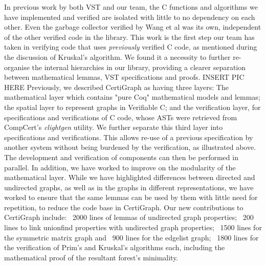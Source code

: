 In previous work by both VST and our team, the C functions and algorithms we have implemented and verified are isolated with little to no dependency on each other. Even the garbage collector verified by Wang et al was its own, independent of the other verified code in the library. This work is the first step our team has taken in verifying code that uses \textit{previously} verified C code, as mentioned during the discussion of Kruskal's algorithm. We found it a necessity to further re-organise the internal hierarchies in our library, providing a clearer separation between mathematical lemmas, VST specifications and proofs.
\newline\newline
INSERT PIC HERE
\newline\newline
Previously, we described CertiGraph as having three layers: The mathematical layer which contains "pure Coq" mathematical models and lemmas; the spatial layer to represent graphs in Verifiable C; and the verification layer, for specifications and verifications of C code, whose ASTs were retrieved from CompCert's \textit{clightgen} utility. We further separate this third layer into specifications and verifications. This allows re-use of a previous specification by another system without being burdened by the verification, as illustrated above. The development and verification of components can then be performed in parallel.
\newline\newline
In addition, we have worked to improve on the modularity of the mathematical layer. While we have highlighted differences between directed and undirected graphs, as well as in the graphs in different representations, we have worked to ensure that the same lemmas can be used by them with little need for repetition, to reduce the code base in CertiGraph. Our new contributions to CertiGraph include: ~2000 lines of lemmas of undirected graph properties; ~200 lines to link unionfind properties with undirected graph properties; ~1500 lines for the symmetric matrix graph and ~900 lines for the edgelist graph; ~1800 lines for the verification of Prim's and Kruskal's algorithms each, including the mathematical proof of the resultant forest's minimality.